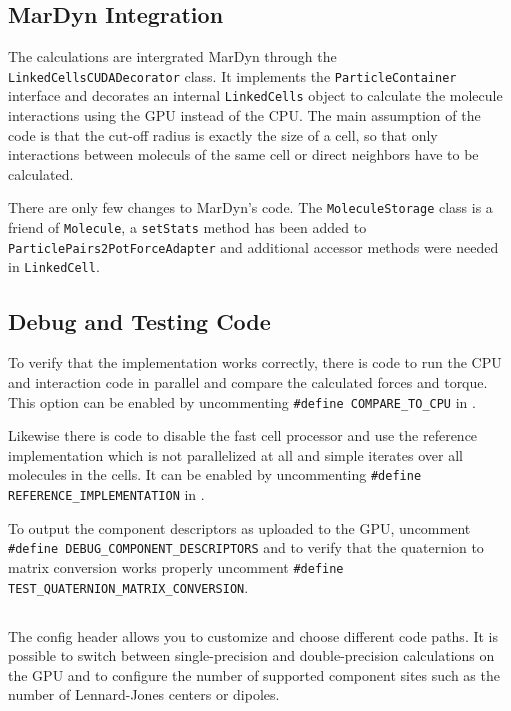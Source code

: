 
\subsection{MarDyn Integration}
The \cuda{} calculations are intergrated MarDyn through the \lstinline!LinkedCellsCUDADecorator! class. It implements the \lstinline!ParticleContainer! interface and decorates an internal \lstinline!LinkedCells! object to calculate the molecule interactions using the GPU instead of the CPU.
The main assumption of the code is that the cut-off radius is exactly the size of a cell, so that only interactions between moleculs of the same cell or direct neighbors have to be calculated.

There are only few changes to MarDyn's code. The \lstinline!MoleculeStorage! class is a friend of \lstinline!Molecule!, a \lstinline!setStats! method has been added to \lstinline!ParticlePairs2PotForceAdapter! and additional accessor methods were needed in \lstinline!LinkedCell!.

\subsection{Debug and Testing Code}
To verify that the \cuda{} implementation works correctly, there is code to run the CPU and \cuda{} interaction code in parallel and compare the calculated forces and torque.
This option can be enabled by uncommenting \lstinline!#define COMPARE_TO_CPU! in .

Likewise there is code to disable the fast cell processor and use the reference implementation which is not parallelized at all and simple iterates over all molecules in the cells.
It can be enabled by uncommenting \lstinline!#define REFERENCE_IMPLEMENTATION! in .

To output the component descriptors as uploaded to the GPU, uncomment \lstinline!#define DEBUG_COMPONENT_DESCRIPTORS! and to verify that the quaternion to matrix conversion works properly uncomment \lstinline!#define TEST_QUATERNION_MATRIX_CONVERSION!.

\subsection{}
The config header allows you to customize and choose different code paths. It is possible to switch between single-precision and double-precision calculations on the GPU and to configure the number of supported component sites such as the number of Lennard-Jones centers or dipoles.


